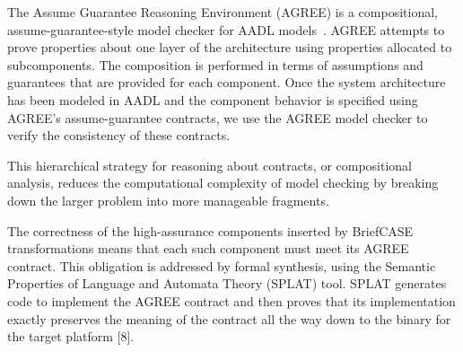 The Assume Guarantee Reasoning Environment (AGREE) is a compositional, assume-guarantee-style model checker for AADL models~\cite{compositional-analysis-agree}. AGREE attempts to prove properties about one layer of the architecture using properties allocated to subcomponents. The composition is performed in terms of assumptions and guarantees that are provided for each component. 
Once the system architecture has been modeled in AADL and the component behavior is specified using AGREE’s assume-guarantee contracts, we use the AGREE model checker to verify the consistency of these contracts.
%
%

This hierarchical strategy for reasoning about contracts, or compositional analysis, reduces the computational complexity of model checking by breaking down the larger problem into more manageable fragments.

The correctness of the high-assurance components inserted by BriefCASE transformations means that each such component must meet its AGREE contract. This obligation is addressed by formal synthesis, using the Semantic Properties of Language and Automata Theory (SPLAT) tool. SPLAT generates code to implement the AGREE contract and then proves that its implementation exactly preserves the meaning of the contract all the way down to the binary for the target platform [8].

